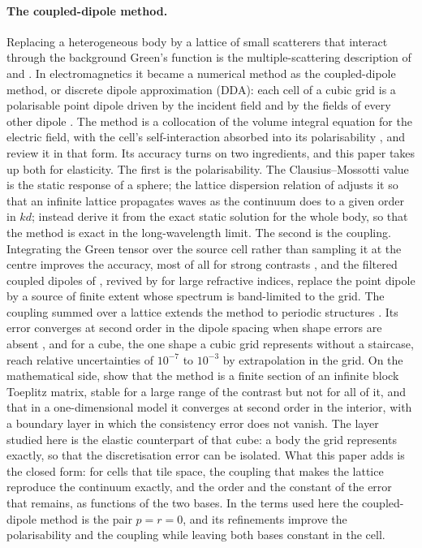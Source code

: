 \documentclass[11pt,a4paper]{article}
\begin{document}
\paragraph{The coupled-dipole method.} Replacing a heterogeneous body by a lattice of small
scatterers that interact through the background Green's function is the multiple-scattering
description of \citet{Foldy1945} and \citet{Lax1951}. In electromagnetics it became a numerical
method as the coupled-dipole method, or discrete dipole approximation (DDA): each cell of a cubic
grid is a polarisable point dipole driven by the incident field and by the fields of every other
dipole \citep{Purcell1973,Draine1994}. The method is a collocation of the volume integral equation
for the electric field, with the cell's self-interaction absorbed into its polarisability
\citep{Lakhtakia1992}, and \citet{YurkinHoekstra2007} review it in that form. Its accuracy turns on
two ingredients, and this paper takes up both for elasticity. The first is the polarisability. The
Clausius--Mossotti value is the static response of a sphere; the lattice dispersion relation of
\citet{Draine1993} adjusts it so that an infinite lattice propagates waves as the continuum does to
a given order in $kd$; \citet{Rahmani2002} instead derive it from the exact static solution for the
whole body, so that the method is exact in the long-wavelength limit. The second is the coupling.
Integrating the Green tensor over the source cell rather than sampling it at the centre improves the
accuracy, most of all for strong contrasts \citep{Chaumet2004}, and the filtered coupled dipoles of
\citet{Piller1998}, revived by \citet{Yurkin2010} for large refractive indices, replace the point
dipole by a source of finite extent whose spectrum is band-limited to the grid. The coupling summed
over a lattice extends the method to periodic structures \citep{Chaumet2003}. Its error converges
at second order in the dipole spacing when shape errors are absent \citep{Yurkin2006}, and for a
cube, the one shape a cubic grid represents without a staircase, \citet{YurkinKahnert2013} reach
relative uncertainties of $10^{-7}$ to $10^{-3}$ by extrapolation in the grid. On the mathematical
side, \citet{Costabel2023} show that the method is a finite section of an infinite block Toeplitz
matrix, stable for a large range of the contrast but not for all of it, and \citet{Costabel2023Hilbert}
that in a one-dimensional model it converges at second order in the interior, with a boundary layer in
which the consistency error does not vanish. The layer studied
here is the elastic counterpart of that cube: a body the grid represents exactly, so that the
discretisation error can be isolated. What this paper adds is the closed form: for cells that tile
space, the coupling that makes the lattice reproduce the continuum exactly, and the order and the
constant of the error that remains, as functions of the two bases. In the terms used here the
coupled-dipole method is the pair $p=r=0$, and its refinements improve the polarisability and the
coupling while leaving both bases constant in the cell.
\end{document}

